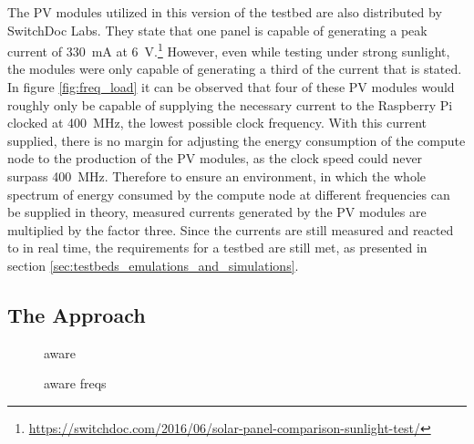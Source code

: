 The PV modules utilized in this version of the testbed are also distributed by
SwitchDoc Labs. They state that one panel is capable of generating a peak
current of \mbox{330 mA} at \mbox{6
V}.\footnote{\url{https://switchdoc.com/2016/06/solar-panel-comparison-sunlight-test/}}
However, even while testing under strong sunlight, the modules were only capable
of generating a third of the current that is stated. In figure
\ref{fig:freq_load} it can be observed that four of these PV modules would
roughly only be capable of supplying the necessary current to the Raspberry Pi
clocked at \mbox{400 MHz}, the lowest possible clock frequency. With this
current supplied, there is no margin for adjusting the energy consumption of the
compute node to the production of the PV modules, as the clock speed could never
surpass \mbox{400 MHz}. Therefore to ensure an environment, in which the whole
spectrum of energy consumed by the compute node at different frequencies can be
supplied in theory, measured currents generated by the PV modules are multiplied
by the factor three. Since the currents are still measured and reacted to in
real time, the requirements for a testbed are still met, as presented in section
\ref{sec:testbeds_emulations_and_simulations}.

\subsection{The Approach}

\begin{figure}
    \centering
    
    \caption{aware}
    \label{fig:aware}
\end{figure}

\begin{figure}
    \centering
    
    \caption{aware freqs}
    \label{fig:aware_freqs}
\end{figure}
